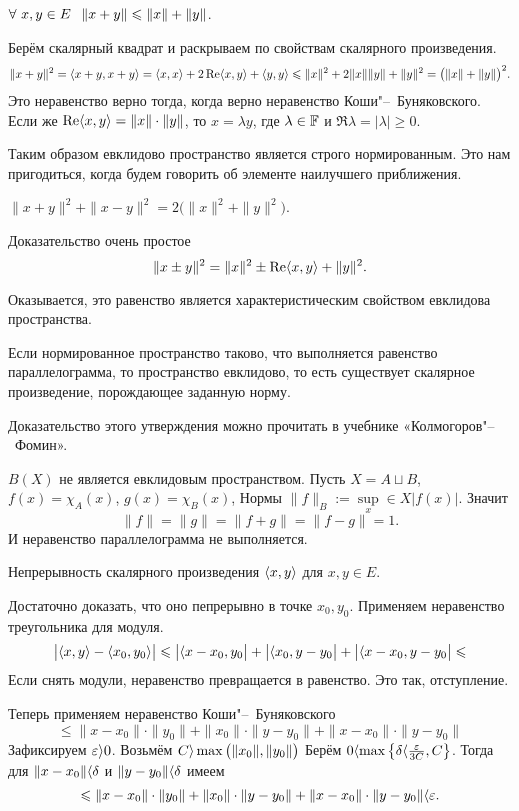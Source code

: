 \begin{Ut}
  $\forall\ x,y\in E\pau \|x+y\|\le \|x\| + \|y\|$.
\end{Ut}
\begin{Proof}
  Берём скалярный квадрат и раскрываем по свойствам скалярного произведения.
  \[
    \|x+y\|^2 = \langle x+y,x+y\rangle  = \langle x,x\rangle  + 2\mathop{\text{Re}}\langle x,y\rangle  + \langle y,y\rangle \leqslant \|x\|^2 + 2\|x\|\|y\|+ \|y\|^2 = \big(\|x\|+\|y\|\big)^2.
  \]
Это неравенство верно тогда, когда верно неравенство Коши"--~Буняковского. Если же $\mathop{\text{Re}}\langle x,y\rangle =\|x\|\cdot\|y\|$, то $x = \lambda y$, где $\lambda\in\mathbb F$ и $\Re\lambda =|\lambda|\ge 0$.
\end{Proof}

Таким образом евклидово пространство является строго нормированным. Это нам пригодиться, когда будем говорить об элементе наилучшего приближения.

\begin{Ut}
  $\|x+y\|^2 + \|x-y\|^2 = 2\big(\|x\|^2+\|y\|^2\big)$.
\end{Ut}
\begin{Proof}
  Доказательство очень простое
\[
  \|x\pm y\|^2 = \|x\|^2\pm\mathop{\text{Re}}\langle x,y\rangle  + \|y\|^2.
\]
\end{Proof}
Оказывается, это равенство является характеристическим свойством евклидова пространства.
\begin{Ut}
  Если нормированное пространство таково, что выполняется равенство параллелограмма, то пространство евклидово, то есть существует скалярное произведение, порождающее заданную норму.
\end{Ut}

Доказательство этого утверждения можно прочитать в учебнике «Колмогоров"--~Фомин».

$B(X)$ не является евклидовым пространством. Пусть $X = A\sqcup B$, $f(x) = \chi_A(x)$, $g(x) = \chi_B(x)$, Нормы $\|f\|_B:=\sup\limits_x\in X\big|f(x)\big|$. Значит
\[
  \|f\| = \|g\| = \|f+g\| = \|f-g\|=1.
\]
И неравенство параллелограмма не выполняется.

\begin{Ut}
  Непрерывность скалярного произведения $\langle x,y\rangle $ для $x,y\in E$.
\end{Ut}
\begin{Proof}
  Достаточно доказать, что оно пепрерывно в точке $x_0,y_0$. Применяем неравенство треугольника для модуля.
\[
  \big|\langle x,y\rangle  - \langle x_0,y_0\rangle \big|\leqslant \big|\langle x-x_0,y_0\big|+\big|\langle x_0,y-y_0\big| + \big|\langle x-x_0,y-y_0\big|\leqslant
\]
Если снять модули, неравенство превращается в равенство. Это так, отступление.

Теперь применяем неравенство Коши"--~Буняковского
\[
  \le \|x-x_0\|\cdot\|y_0\| + \|x_0\|\cdot \|y-y_0\| + \|x-x_0\|\cdot \|y-y_0\|
\]
Зафиксируем $\varepsilon\rangle 0$. Возьмём $C\rangle \max\big(\|x_0\|,\|y_0\|\big)$ Берём $0\langle \max\left\{\delta\langle \frac{\varepsilon}{3C},C\right\}$. Тогда для $\|x-x_0\|\langle \delta$ и $\|y-y_0\|\langle \delta$ имеем
\[
  \leqslant \|x-x_0\|\cdot\|y_0\| + \|x_0\|\cdot \|y-y_0\| + \|x-x_0\|\cdot \|y-y_0\| \langle \varepsilon.
\]
\end{Proof}

